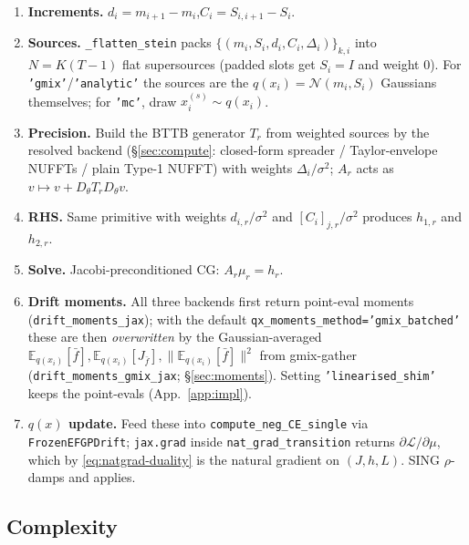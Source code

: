 \documentclass[11pt]{article}
\newcommand{\Eqx}{\mathbb{E}_{q(x_i)}}
\newcommand{\code}[1]{\texttt{\small #1}}
\begin{document}
\begin{enumerate}
\item \textbf{Increments.} $d_i = m_{i+1}-m_i$,\quad $C_i = S_{i,i+1}-S_i$.
\item \textbf{Sources.} \code{\_flatten\_stein} packs
  $\{(m_i,S_i,d_i,C_i,\Delta_i)\}_{k,i}$ into $N=K(T{-}1)$ flat
  supersources (padded slots get $S_i{=}I$ and weight $0$). For
  \code{'gmix'}/\code{'analytic'} the sources are the
  $q(x_i)=\mathcal{N}(m_i,S_i)$ Gaussians themselves; for \code{'mc'},
  draw $x_i^{(s)}\sim q(x_i)$.
\item \textbf{Precision.} Build the BTTB generator $T_r$ from weighted
  sources by the resolved backend (§\ref{sec:compute}: closed-form
  spreader / Taylor-envelope NUFFTs / plain Type-1 NUFFT) with weights
  $\Delta_i/\sigma^2$; $A_r$ acts as
  $v \mapsto v + D_\theta T_r D_\theta v$.
\item \textbf{RHS.} Same primitive with weights $d_{i,r}/\sigma^2$ and
  $[C_i]_{j,r}/\sigma^2$ produces $h_{1,r}$ and $h_{2,r}$.
\item \textbf{Solve.} Jacobi-preconditioned CG: $A_r\mu_r = h_r$.
\item \textbf{Drift moments.} All three backends first return point-eval
  moments (\code{drift\_moments\_jax}); with the default
  \code{qx\_moments\_method='gmix\_batched'} these are then
  \emph{overwritten} by the Gaussian-averaged
  $\Eqx[\bar f], \Eqx[J_{\bar f}], \|\Eqx[\bar f]\|^2$ from gmix-gather
  (\code{drift\_moments\_gmix\_jax}; §\ref{sec:moments}). Setting
  \code{'linearised\_shim'} keeps the point-evals (App.~\ref{app:impl}).
\item \textbf{$q(x)$ update.} Feed these into
  \code{compute\_neg\_CE\_single} via \code{FrozenEFGPDrift};
  \code{jax.grad} inside \code{nat\_grad\_transition} returns
  $\partial\mathcal{L}/\partial\mu$, which by
  \eqref{eq:natgrad-duality} is the natural gradient on $(J, h, L)$.
  SING $\rho$-damps and applies.
\end{enumerate}

\subsection*{Complexity}
\label{sec:complexity}
\end{document}
